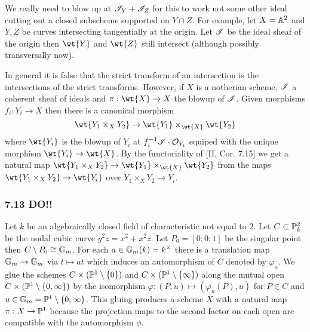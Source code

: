 \documentclass[12pt]{article}
\begin{document}
\begin{rmk}
We really need to blow up at $\I_Y + \I_Z$ for this to work not some other ideal cutting out a closed subscheme supported on $Y \cap Z$. For example, let $X = \A^2$ and $Y,Z$ be curves intersecting tangentially at the origin. Let $\I$ be the ideal sheaf of the origin then $\wt{Y}$ and $\wt{Z}$ still intersect (although possibly transversally now). 
\end{rmk}

\begin{rmk}
In general it is false that the strict transform of an intersection is the intersections of the strict transforms. However, if $X$ is a notherian scheme, $\I$ a coherent sheaf of ideals and $\pi : \wt{X} \to X$ the blowup of $\I$. Given morphisms $f_i : Y_i \to X$ then there is a canonical morphism
\[ \wt{Y_1 \times_X Y_2} \to \wt{Y_1} \times_{\wt{X}} \wt{Y_2} \]
where $\wt{Y_i}$ is the blowup of $Y_i$ at $f_i^{-1} \I \cdot \struct{Y_i}$ equiped with the unique morphism $\wt{Y_i} \to \wt{X}$. By the functoriality of [II, Cor. 7.15] we get a natural map $\wt{Y_1 \times_X Y_2} \to \wt{Y_1} \times_{\wt{X}} \wt{Y_2}$ from the maps $\wt{Y_1 \times_X Y_2} \to \wt{Y_i}$ over $Y_1 \times_X Y_2 \to Y_i$. 
\end{rmk}

\subsubsection{7.13 DO!!}

Let $k$ be an algebraically closed field of characteristic not equal to $2$. Let $C \subset \P^2_k$ be the nodal cubic curve $y^2 z = x^2 + x^2 z$. Let $P_0 = [0:0:1]$ be the singular point then $C \setminus P_0 \cong \Gm$. For each $a \in \Gm(k) = k^\times$ there is a translation map $\Gm \to \Gm$ via $t \mapsto a t$ which induces an automorphism of $C$ denoted by $\varphi_a$. We glue the schemes $C \times (\P^1 \setminus \{ 0 \})$ and $C \times (\P^1 \setminus \{ \infty \})$ along the mutual open $C \times (\P^1 \setminus \{ 0, \infty \})$ by the isomorphism $\varphi : (P, u) \mapsto (\varphi_u(P), u)$ for $P \in C$ and $u \in \Gm = \P^1 \setminus \{ 0, \infty \}$. This gluing produces a scheme $X$ with a natural map $\pi : X \to \P^1$ because the projection maps to the second factor on each open are compatible with the automorphism $\phi$.
\end{document}

